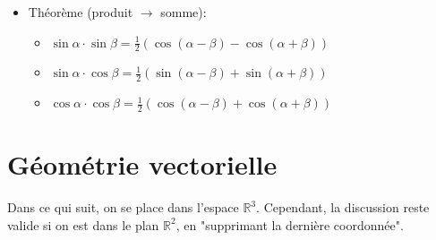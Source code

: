 \documentclass[12pt,a4paper]{article}
\begin{document}
\begin{itemize}[label=$\bullet$]
\begin{itemize}[label=$\circ$]
\end{itemize}
\item \textcolor{th!60!black}{Théorème (produit $\rightarrow$ somme)}:
\begin{itemize}[label=$\circ$]
\item $\sin\alpha\cdot\sin\beta=\frac{1}{2}\left(\cos(\alpha-\beta)-\cos(\alpha+\beta)\right)$
\item $\sin\alpha\cdot\cos\beta=\frac{1}{2}\left(\sin(\alpha-\beta)+\sin(\alpha+\beta)\right)$
\item $\cos\alpha\cdot\cos\beta=\frac{1}{2}\left(\cos(\alpha-\beta)+\cos(\alpha+\beta)\right)$
\end{itemize}
\end{itemize}
\newpage 
\section{Géométrie vectorielle}
\noindent Dans ce qui suit, on se place dans l'espace $\mathbb{R}^3$. Cependant, la discussion reste valide si on est dans le plan $\mathbb{R}^2$, en "supprimant la dernière coordonnée".
\end{document}
